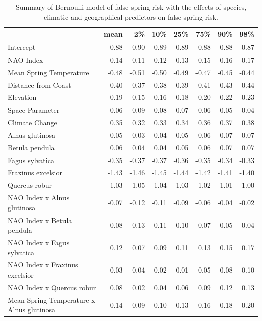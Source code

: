 \documentclass{article}\usepackage[]{graphicx}\usepackage[]{color}
\begin{document}
\begin{longtable}{lrrrrrrr}
\caption{Summary of Bernoulli model of false spring risk with the effects of species, climatic and geographical predictors on false spring risk.} \\ 
  \hline
 & mean & 2\% & 10\% & 25\% & 75\% & 90\% & 98\% \\ 
  \hline \endhead  \hline
Intercept & -0.88 & -0.90 & -0.89 & -0.89 & -0.88 & -0.88 & -0.87 \\ 
  NAO Index & 0.14 & 0.11 & 0.12 & 0.13 & 0.15 & 0.16 & 0.17 \\ 
  Mean Spring 
Temperature & -0.48 & -0.51 & -0.50 & -0.49 & -0.47 & -0.45 & -0.44 \\ 
  Distance from 
Coast & 0.40 & 0.37 & 0.38 & 0.39 & 0.41 & 0.43 & 0.44 \\ 
  Elevation & 0.19 & 0.15 & 0.16 & 0.18 & 0.20 & 0.22 & 0.23 \\ 
  Space Parameter & -0.06 & -0.09 & -0.08 & -0.07 & -0.06 & -0.05 & -0.04 \\ 
  Climate Change & 0.35 & 0.32 & 0.33 & 0.34 & 0.36 & 0.37 & 0.38 \\ 
  Alnus glutinosa & 0.05 & 0.03 & 0.04 & 0.05 & 0.06 & 0.07 & 0.07 \\ 
  Betula pendula & 0.06 & 0.04 & 0.04 & 0.05 & 0.06 & 0.07 & 0.07 \\ 
  Fagus sylvatica & -0.35 & -0.37 & -0.37 & -0.36 & -0.35 & -0.34 & -0.33 \\ 
  Fraxinus excelsior & -1.43 & -1.46 & -1.45 & -1.44 & -1.42 & -1.41 & -1.40 \\ 
  Quercus robur & -1.03 & -1.05 & -1.04 & -1.03 & -1.02 & -1.01 & -1.00 \\ 
  NAO Index
x Alnus glutinosa & -0.07 & -0.12 & -0.11 & -0.09 & -0.06 & -0.04 & -0.02 \\ 
  NAO Index
x Betula pendula & -0.08 & -0.13 & -0.11 & -0.10 & -0.07 & -0.05 & -0.04 \\ 
  NAO Index
x Fagus sylvatica & 0.12 & 0.07 & 0.09 & 0.11 & 0.13 & 0.15 & 0.17 \\ 
  NAO Index
x Fraxinus excelsior & 0.03 & -0.04 & -0.02 & 0.01 & 0.05 & 0.08 & 0.10 \\ 
  NAO Index
x Quercus robur & 0.08 & 0.02 & 0.04 & 0.06 & 0.09 & 0.12 & 0.13 \\ 
  Mean Spring 
Temperature
x Alnus glutinosa & 0.14 & 0.09 & 0.10 & 0.13 & 0.16 & 0.18 & 0.20 \\ 

\end{longtable}
\end{document}
